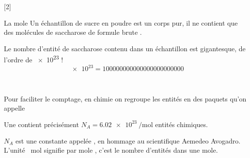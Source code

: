 [2]


\begin{doc}{La mole}
  Un échantillon de sucre en poudre est un corps pur, il ne contient que des molécules de saccharose de formule brute .

  Le nombre d'entité de saccharose contenu dans un échantillon est gigantesque, de l'ordre de \num{e23} !
  \begin{equation*}
    \num{e23} = \num{100 000 000 000 000 000 000 000}
  \end{equation*}

  \begin{figure}
    \centering \vspace*{-50pt}
     \\[4pt]
  \end{figure}
  Pour faciliter le comptage, en chimie on regroupe les entités en des paquets qu'on appelle 
  \begin{importants}
    Une  contient précisément $N_A = \qty{6,02 e23}{\per\mole}$ entités chimiques.
  \end{importants}
  \attention $N_A$ est une constante appelée , en hommage au scientifique Aemedeo Avogadro.
  L'unité \og \unit{\per\mole} \fg\! signifie \og par mole \fg, c’est le nombre d'entités dans une mole.
\end{doc}

